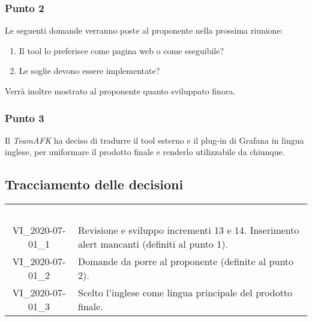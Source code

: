 \subsubsection{Punto 2}
Le seguenti domande verranno poste al proponente nella prossima riunione: \begin{enumerate}
\item Il tool lo preferisce come pagina web o come eseguibile?
\item Le soglie devono essere implementate? 
\end{enumerate}
Verrà inoltre mostrato al proponente quanto sviluppato finora.

\subsubsection{Punto 3}
Il \textit{TeamAFK} ha deciso di tradurre il tool esterno e il plug-in di Grafana in lingua inglese, per uniformare il prodotto finale e renderlo utilizzabile da chiunque.

\subsection{Tracciamento delle decisioni}
\begin{longtable}{ c C{12cm} }
\textcolor{white}{\textbf{Codice}} & \textcolor{white}{\textbf{Decisione}}\\	
		VI\_2020-07-01\_1 & Revisione e sviluppo incrementi 13 e 14. Inserimento alert mancanti (definiti al punto 1).\\
		VI\_2020-07-01\_2 & Domande da porre al proponente (definite al punto 2). \\
		VI\_2020-07-01\_3 & Scelto l'inglese come lingua principale del prodotto finale.
\end{longtable}